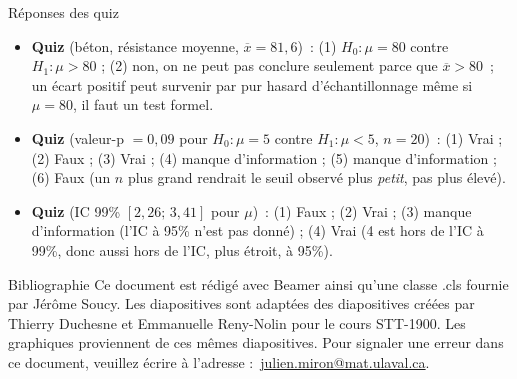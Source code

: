 \documentclass{BeamerTemplate}
\begin{document}
\begin{frame}[t]{Réponses des quiz}
\footnotesize
\begin{itemize}
\item \textbf{Quiz} (béton, résistance moyenne, $\overline x=81{,}6$)~: (1) $H_0:\mu=80$ contre
$H_1:\mu>80$ ; (2) non, on ne peut pas conclure seulement parce que $\overline x>80$~; un écart
positif peut survenir par pur hasard d'échantillonnage même si $\mu=80$, il faut un test formel.
\item \textbf{Quiz} (valeur-p $=0,09$ pour $H_0:\mu=5$ contre $H_1:\mu<5$, $n=20$)~: (1) Vrai ;
(2) Faux ; (3) Vrai ; (4) manque d'information ; (5) manque d'information ; (6) Faux (un $n$
plus grand rendrait le seuil observé plus \emph{petit}, pas plus élevé).
\item \textbf{Quiz} (IC 99\% $[2{,}26;\,3{,}41]$ pour $\mu$)~: (1) Faux ; (2) Vrai ; (3) manque
d'information (l'IC à 95\% n'est pas donné) ; (4) Vrai (4 est hors de l'IC à 99\%, donc aussi
hors de l'IC, plus étroit, à 95\%).
\end{itemize}

\end{frame}

\begin{frame}{Bibliographie}
 	Ce document est rédigé avec Beamer ainsi qu'une classe .cls fournie par Jérôme Soucy. Les diapositives sont adaptées des diapositives créées par Thierry Duchesne et Emmanuelle Reny-Nolin pour le cours STT-1900. Les graphiques proviennent de ces mêmes diapositives.
 	\printbibliography
 	\vfill
 	\footnotesize Pour signaler une erreur dans ce document, veuillez écrire à l'adresse :~\href{mailto:julien.miron@mat.ulaval.ca}{julien.miron@mat.ulaval.ca}.
 \end{frame}
\end{document}
